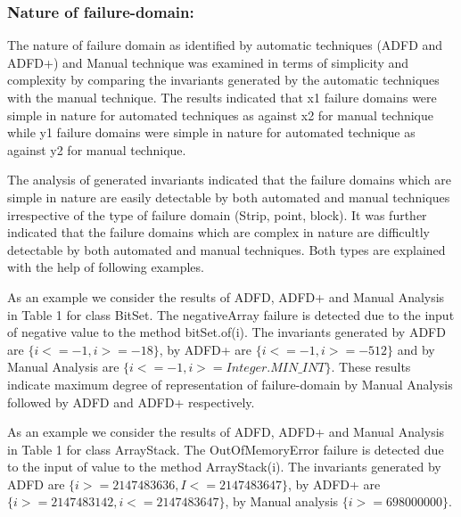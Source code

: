 \documentclass[runningheads,a4paper]{llncs}
\begin{document}
\subsubsection{Nature of failure-domain:}
The nature of failure domain as identified by automatic techniques (ADFD and ADFD+) and Manual technique was examined in terms of simplicity and complexity by comparing the invariants generated by the automatic techniques with the manual technique. The results indicated that x1 failure domains were simple in nature for automated techniques as against x2 for manual technique while y1 failure domains were simple in nature for automated technique as against y2 for manual technique. 

The analysis of generated invariants indicated that the failure domains which are simple in nature are easily detectable by both automated and manual techniques irrespective of the type of failure domain (Strip, point, block). It was further indicated that the failure domains which are complex in nature are difficultly detectable by both automated and manual techniques. Both types are explained with the help of following examples.

As an example we consider the results of ADFD, ADFD+ and Manual Analysis in Table 1 for class BitSet. The negativeArray failure is detected due to the input of negative value to the method bitSet.of(i). The invariants generated by ADFD are $\{i <= -1, i >= -18\}$, by ADFD+ are $\{i <= -1, i >= -512\}$ and by Manual Analysis are $\{i <= -1, i >= Integer.MIN\_INT\}$. These results indicate maximum degree of representation of failure-domain by Manual Analysis followed by ADFD and ADFD+ respectively.


As an example we consider the results of ADFD, ADFD+ and Manual Analysis in Table 1 for class ArrayStack. The OutOfMemoryError failure is detected due to the input of value to the method ArrayStack(i). The invariants generated by ADFD are $\{ i >= 2147483636, I <= 2147483647\}$, by ADFD+ are $\{ i >= 2147483142, i <= 2147483647\}$, by Manual analysis $\{ i >= 698000000 \}$.



\end{document}
